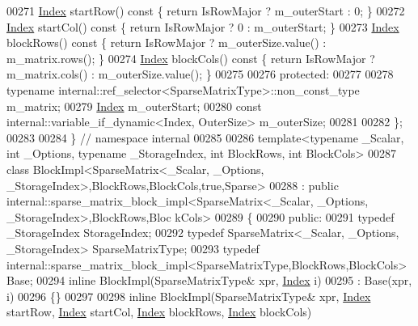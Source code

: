 \begin{DoxyCode}
00271     \hyperlink{namespace_eigen_a62e77e0933482dafde8fe197d9a2cfde}{Index} startRow()\textcolor{keyword}{ const }\{ \textcolor{keywordflow}{return} IsRowMajor ? m\_outerStart : 0; \}
00272     \hyperlink{namespace_eigen_a62e77e0933482dafde8fe197d9a2cfde}{Index} startCol()\textcolor{keyword}{ const }\{ \textcolor{keywordflow}{return} IsRowMajor ? 0 : m\_outerStart; \}
00273     \hyperlink{namespace_eigen_a62e77e0933482dafde8fe197d9a2cfde}{Index} blockRows()\textcolor{keyword}{ const }\{ \textcolor{keywordflow}{return} IsRowMajor ? m\_outerSize.value() : m\_matrix.rows(); \}
00274     \hyperlink{namespace_eigen_a62e77e0933482dafde8fe197d9a2cfde}{Index} blockCols()\textcolor{keyword}{ const }\{ \textcolor{keywordflow}{return} IsRowMajor ? m\_matrix.cols() : m\_outerSize.value(); \}
00275 
00276   \textcolor{keyword}{protected}:
00277 
00278     \textcolor{keyword}{typename} internal::ref\_selector<SparseMatrixType>::non\_const\_type m\_matrix;
00279     \hyperlink{namespace_eigen_a62e77e0933482dafde8fe197d9a2cfde}{Index} m\_outerStart;
00280     \textcolor{keyword}{const} internal::variable\_if\_dynamic<Index, OuterSize> m\_outerSize;
00281 
00282 \};
00283 
00284 \} \textcolor{comment}{// namespace internal}
00285 
00286 \textcolor{keyword}{template}<\textcolor{keyword}{typename} \_Scalar, \textcolor{keywordtype}{int} \_Options, \textcolor{keyword}{typename} \_StorageIndex, \textcolor{keywordtype}{int} BlockRows, \textcolor{keywordtype}{int} BlockCols>
00287 \textcolor{keyword}{class }BlockImpl<SparseMatrix<\_Scalar, \_Options, \_StorageIndex>,BlockRows,BlockCols,true,Sparse>
00288   : \textcolor{keyword}{public} internal::sparse\_matrix\_block\_impl<SparseMatrix<\_Scalar, \_Options, \_StorageIndex>,BlockRows,Bloc
      kCols>
00289 \{
00290 \textcolor{keyword}{public}:
00291   \textcolor{keyword}{typedef} \_StorageIndex StorageIndex;
00292   \textcolor{keyword}{typedef} SparseMatrix<\_Scalar, \_Options, \_StorageIndex> SparseMatrixType;
00293   \textcolor{keyword}{typedef} internal::sparse\_matrix\_block\_impl<SparseMatrixType,BlockRows,BlockCols> Base;
00294   \textcolor{keyword}{inline} BlockImpl(SparseMatrixType& xpr, \hyperlink{namespace_eigen_a62e77e0933482dafde8fe197d9a2cfde}{Index} i)
00295     : Base(xpr, i)
00296   \{\}
00297 
00298   \textcolor{keyword}{inline} BlockImpl(SparseMatrixType& xpr, \hyperlink{namespace_eigen_a62e77e0933482dafde8fe197d9a2cfde}{Index} startRow, \hyperlink{namespace_eigen_a62e77e0933482dafde8fe197d9a2cfde}{Index} startCol, 
      \hyperlink{namespace_eigen_a62e77e0933482dafde8fe197d9a2cfde}{Index} blockRows, \hyperlink{namespace_eigen_a62e77e0933482dafde8fe197d9a2cfde}{Index} blockCols)

\end{DoxyCode}
